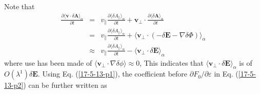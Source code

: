 \documentclass{article}
\begin{document}
Note that
\begin{eqnarray}
  \frac{\partial \langle \mathbf{v} \cdot \delta \mathbf{A}
  \rangle_{\alpha}}{\partial t} & = & v_{\parallel} \frac{\partial \langle
  \delta A_{\parallel} \rangle_{\alpha}}{\partial t} +\mathbf{v}_{\perp} \cdot
  \frac{\partial \langle \delta \mathbf{A} \rangle_{\alpha}}{\partial t}
  \nonumber\\
  & = & v_{\parallel} \frac{\partial \langle \delta A_{\parallel}
  \rangle_{\alpha}}{\partial t} + \langle \mathbf{v}_{\perp} \cdot (- \delta
  \mathbf{E}- \nabla \delta \Phi) \rangle_{\alpha} \nonumber\\
  & \approx & v_{\parallel} \frac{\partial \langle \delta A_{\parallel}
  \rangle_{\alpha}}{\partial t} - \langle \mathbf{v}_{\perp} \cdot \delta
  \mathbf{E} \rangle_{\alpha}  \label{17-5-13-p1}
\end{eqnarray}
where use has been made of $\langle \mathbf{v}_{\perp} \cdot \nabla \delta
\phi \rangle \approx 0$, This indicates that $\langle \mathbf{v}_{\perp} \cdot
\delta \mathbf{E} \rangle_{\alpha}$ is of $O (\lambda^1) \delta \mathbf{E}$.
Using Eq. (\ref{17-5-13-p1}), the coefficient before $\partial F_0 / \partial
\varepsilon$ in Eq. (\ref{17-5-13-p2}) can be further written as
\end{document}
